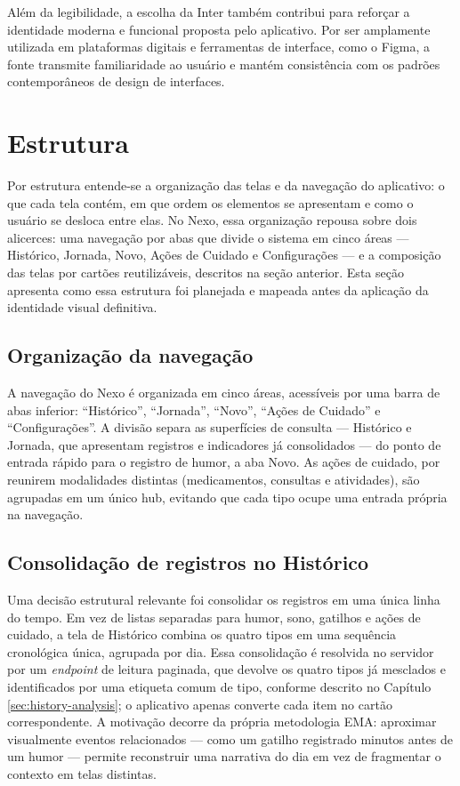 Além da legibilidade, a escolha da Inter também contribui para reforçar a
identidade moderna e funcional proposta pelo aplicativo. Por ser amplamente
utilizada em plataformas digitais e ferramentas de interface, como o Figma, a
fonte transmite familiaridade ao usuário e mantém consistência com os padrões
contemporâneos de design de interfaces.

\section{Estrutura}

Por estrutura entende-se a organização das telas e da navegação do aplicativo:
o que cada tela contém, em que ordem os elementos se apresentam e como o
usuário se desloca entre elas. No Nexo, essa organização repousa sobre dois
alicerces: uma navegação por abas que divide o sistema em cinco áreas ---
Histórico, Jornada, Novo, Ações de Cuidado e Configurações --- e a composição
das telas por cartões reutilizáveis, descritos na seção anterior. Esta seção
apresenta como essa estrutura foi planejada e mapeada antes da aplicação da
identidade visual definitiva.

\subsection{Organização da navegação}

A navegação do Nexo é organizada em cinco áreas, acessíveis por uma barra de
abas inferior: ``Histórico'', ``Jornada'', ``Novo'', ``Ações de Cuidado'' e
``Configurações''. A divisão separa as superfícies de consulta --- Histórico e
Jornada, que apresentam registros e indicadores já consolidados --- do ponto de
entrada rápido para o registro de humor, a aba Novo. As ações de cuidado, por
reunirem modalidades distintas (medicamentos, consultas e atividades), são
agrupadas em um único hub, evitando que cada tipo ocupe uma entrada própria na
navegação.

\subsection{Consolidação de registros no Histórico}

Uma decisão estrutural relevante foi consolidar os registros em uma única linha
do tempo. Em vez de listas separadas para humor, sono, gatilhos e ações de
cuidado, a tela de Histórico combina os quatro tipos em uma sequência
cronológica única, agrupada por dia. Essa consolidação é resolvida no servidor
por um \textit{endpoint} de leitura paginada, que devolve os quatro tipos já
mesclados e identificados por uma etiqueta comum de tipo, conforme
descrito no Capítulo \ref{sec:history-analysis}; o aplicativo apenas converte
cada item no cartão correspondente. A motivação decorre da própria metodologia
EMA: aproximar visualmente eventos relacionados --- como um gatilho registrado
minutos antes de um humor --- permite reconstruir uma narrativa do dia em vez
de fragmentar o contexto em telas distintas.

